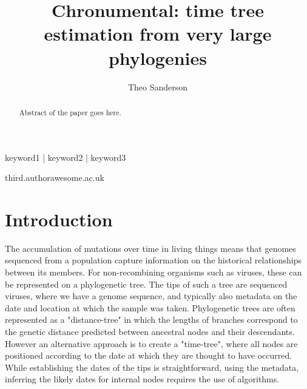 
\title{Chronumental: time tree estimation from very large phylogenies}

\author[1,2]{Theo Sanderson}

\date{}

\maketitle

\begin{abstract}
Abstract of the paper goes here.
\lipsum[1]
\end{abstract}

\begin{keywords}
keyword1 | keyword2 | keyword3
\end{keywords}

\begin{corrauthor}
third.author\at awesome.ac.uk
\end{corrauthor}

\section*{Introduction}\label{s:introduction}
The accumulation of mutations over time in living things means that genomes sequenced from a population capture information on the historical relationships between its members. For non-recombining organisms such as viruses, these can be represented on a phylogenetic tree. The tips of such a tree are sequenced viruses, where we have a genome sequence, and typically also metadata on the date and location at which the sample was taken. Phylogenetic trees are often represented as a "distance-tree" in which the lengths of branches correspond to the genetic distance predicted between ancestral nodes and their descendants. However an alternative approach is to create a "time-tree", where all nodes are positioned according to the date at which they are thought to have occurred. While establishing the dates of the tips is straightforward, using the metadata, inferring the likely dates for internal nodes requires the use of algorithms.

